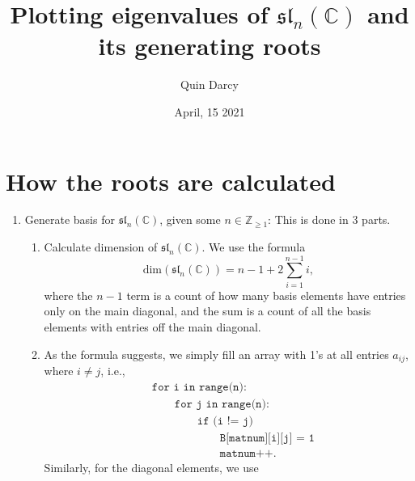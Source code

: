 \documentclass[12pt]{article}
\theoremstyle{definition}
\theoremstyle{definition}
\begin{document}
\title{Plotting eigenvalues of $\mathfrak{sl}_n(\mathbb{C})$ and its generating roots}
\author{Quin Darcy}
\date{April, 15 2021}
\maketitle
    \section{How the roots are calculated}
    \begin{enumerate}
        \item Generate basis for $\mathfrak{sl}_n(\mathbb{C})$, given some
            $n\in\mathbb{Z}_{\geq 1}$: This is done in 3 parts.
            \begin{enumerate}
                \item Calculate dimension of $\mathfrak{sl}_n(\mathbb{C})$. We
                    use the formula 
                    \begin{equation*}
                        \text{dim}(\mathfrak{sl}_n(\mathbb{C}))=n-1+2\sum_{i=1}^{n-1}i,
                    \end{equation*}
                    where the $n-1$ term is a count of how many basis elements have
                    entries only on the main diagonal, and the sum is a count of
                    all the basis elements with entries off the main diagonal.
                \item As the formula suggests, we simply fill an array with 1's at
                    all entries $a_{ij}$, where $i\neq j$, i.e., 
                    \begin{equation*}
                        \begin{split}
                            &\texttt{for i in range(n):} \\
                            &\quad\quad\texttt{for j in range(n):} \\
                            &\quad\quad\quad\quad\texttt{if (i != j)} \\
                            &\quad\quad\quad\quad\quad\quad\texttt{B[matnum][i][j] = 1} \\ 
                            &\quad\quad\quad\quad\quad\quad\texttt{matnum++}.
                        \end{split} 
                    \end{equation*}
                    Similarly, for the diagonal elements, we use 
                    \begin{equation*}

\end{equation*}
\end{enumerate}
\end{enumerate}
\end{document}
